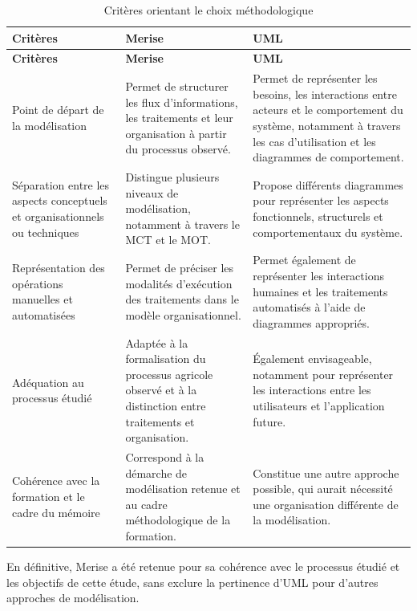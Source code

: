 {\small
\begin{longtable}{|p{3.2cm}|p{5.4cm}|p{5.4cm}|}
    \caption{Critères orientant le choix méthodologique}
    \label{tab:criteres_choix_methodologique} \\
    \hline
    \textbf{Critères} & \textbf{Merise} & \textbf{UML} \\
    \hline
    \endfirsthead
    \hline
    \textbf{Critères} & \textbf{Merise} & \textbf{UML} \\
    \hline
    \endhead
    Point de départ de la modélisation & Permet de structurer les flux d'informations, les traitements et leur organisation à partir du processus observé. & Permet de représenter les besoins, les interactions entre acteurs et le comportement du système, notamment à travers les cas d'utilisation et les diagrammes de comportement. \\
    \hline
    Séparation entre les aspects conceptuels et organisationnels ou techniques & Distingue plusieurs niveaux de modélisation, notamment à travers le MCT et le MOT. & Propose différents diagrammes pour représenter les aspects fonctionnels, structurels et comportementaux du système. \\
    \hline
    Représentation des opérations manuelles et automatisées & Permet de préciser les modalités d'exécution des traitements dans le modèle organisationnel. & Permet également de représenter les interactions humaines et les traitements automatisés à l'aide de diagrammes appropriés. \\
    \hline
    Adéquation au processus étudié & Adaptée à la formalisation du processus agricole observé et à la distinction entre traitements et organisation. & Également envisageable, notamment pour représenter les interactions entre les utilisateurs et l'application future. \\
    \hline
    Cohérence avec la formation et le cadre du mémoire & Correspond à la démarche de modélisation retenue et au cadre méthodologique de la formation. & Constitue une autre approche possible, qui aurait nécessité une organisation différente de la modélisation. \\
    \hline
\end{longtable}
}

En définitive, Merise a été retenue pour sa cohérence avec le processus étudié et les objectifs de cette étude, sans exclure la pertinence d’UML pour d’autres approches de modélisation.


